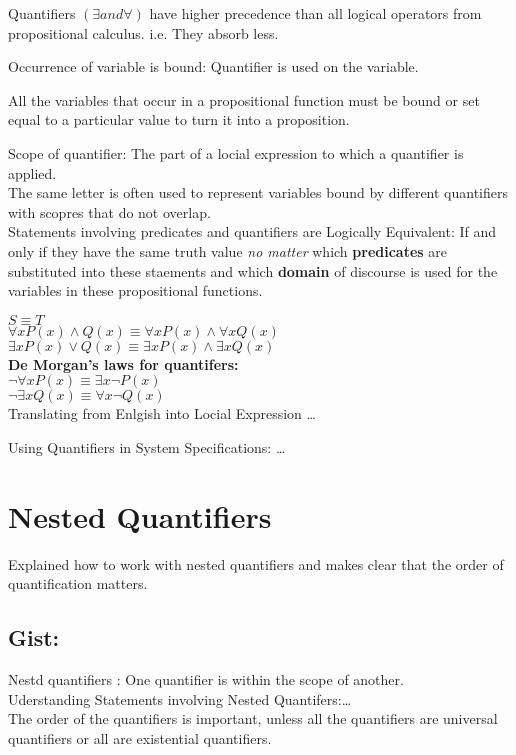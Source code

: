 \documentclass[none,green,normal,cn]{elegantnote}
\begin{document}
Quantifiers \((\exists and \forall)\) have higher precedence than all logical operators from propositional calculus. i.e. They absorb less.

Occurrence of variable is bound: Quantifier is used on the variable.

All the variables that occur in a propositional function must be bound or set equal to a particular value to turn it into a proposition.

Scope of quantifier: The part of a locial expression to which a quantifier is applied.\\
The same letter is often used to represent variables bound by different quantifiers with scopres that do not overlap.\\
Statements involving predicates and quantifiers are Logically Equivalent: 
If and only if they have the same truth value \emph{no matter} which \textbf{predicates} are substituted into these staements and which \textbf{domain}  of discourse is used for the variables in these propositional functions.

\(S \equiv T\) \\
\(\forall x P(x) \wedge Q(x) \equiv \forall x P(x) \wedge \forall x Q(x)\)\\
\(\exists x P(x) \vee Q(x) \equiv \exists x P(x) \wedge \exists x Q(x)\)\\
\textbf{De Morgan's laws for quantifers:}\\
\(\neg \forall x P(x) \equiv \exists x \neg P(x)\)\\
\(\neg \exists x Q(x) \equiv \forall x \neg Q(x)\)\\

Translating from Enlgish into Locial Expression \dots

Using Quantifiers in System Specifications: \dots

\section{Nested Quantifiers}
Explained how to work with nested quantifiers and makes clear that the order of quantification matters.

\subsection{Gist:}
Nestd quantifiers : One quantifier is within the scope of another.\\
Uderstanding Statements involving Nested Quantifers:\dots\\
The order of the quantifiers is important, unless all the quantifiers are universal quantifiers or all are existential quantifiers.\\
\end{document}
